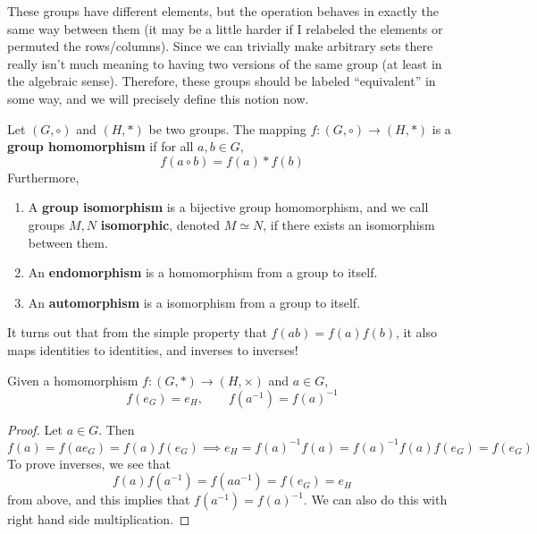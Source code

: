   These groups have different elements, but the operation behaves in exactly the same way between them (it may be a little harder if I relabeled the elements or permuted the rows/columns). Since we can trivially make arbitrary sets there really isn't much meaning to having two versions of the same group (at least in the algebraic sense). Therefore, these groups should be labeled ``equivalent'' in some way, and we will precisely define this notion now. 

  \begin{definition}
    \label{def:group-homomorphism}
    Let $(G, \circ)$ and $(H, *)$ be two groups. The mapping $f: (G, \circ) \to (H, *)$ is a \textbf{group homomorphism} if for all $a, b \in G$, 
    \begin{equation}
      f(a \circ b) = f(a) * f(b)
    \end{equation} 
    Furthermore, 
    \begin{enumerate}
      \item A \textbf{group isomorphism} is a bijective group homomorphism, and we call groups $M, N$ \textbf{isomorphic}, denoted $M \simeq N$, if there exists an isomorphism between them. 
      \item An \textbf{endomorphism} is a homomorphism from a group to itself. 
      \item An \textbf{automorphism} is a isomorphism from a group to itself. 
    \end{enumerate}
  \end{definition} 

  It turns out that from the simple property that $f(ab) = f(a) f(b)$, it also maps identities to identities, and inverses to inverses!  

  \begin{lemma}
    \label{thm:homomorphisms-maps-identities-inverses-to}
    Given a homomorphism $f: (G, \ast) \rightarrow (H, \times)$ and $a \in G$, 
    \begin{equation}
      f(e_G) = e_H, \qquad f(a^{-1}) = f(a)^{-1}
    \end{equation}
  \end{lemma}
  \begin{proof}
    Let $a \in G$. Then 
    \begin{equation}
      f(a) = f(a e_G) = f(a) f(e_G) \implies e_H = f(a)^{-1} f(a) = f(a)^{-1} f(a) f(e_G) = f(e_G)
    \end{equation}
    To prove inverses, we see that 
    \begin{equation}
      f(a) f(a^{-1}) = f(a a^{-1}) = f(e_G) = e_H
    \end{equation}
    from above, and this implies that $f(a^{-1}) = f(a)^{-1}$. We can also do this with right hand side multiplication. 
  \end{proof}

